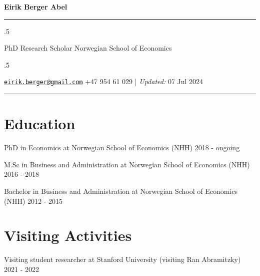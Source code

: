 \documentclass[11pt,]{article}
\begin{document}
\centerline{\huge \bf Eirik Berger Abel}

\vspace{2 mm}

\hrule

\vspace{2 mm}

\moveleft.5\hoffset\centerline{PhD Research Scholar \textbar{} Norwegian
School of Economics}

\moveleft.5\hoffset\centerline{ \faEnvelopeO \hspace{1 mm} \href{mailto:}{\tt \href{mailto:eirik.berger@gmail.com}{\nolinkurl{eirik.berger@gmail.com}}} \hspace{1 mm}  \faPhone \hspace{1 mm}  +47
954 61 029  \hspace{1 mm}         | \emph{Updated:} 07 Jul 2024}



\vspace{2 mm}

\hrule



\hypertarget{education}{%
\section{Education}\label{education}}

PhD in Economics at Norwegian School of Economics (NHH) \hfill 2018 -
ongoing\vspace{-0.2cm}

M.Sc in Business and Administration at Norwegian School of Economics
(NHH) \hfill 2016 - 2018\vspace{-0.2cm}

Bachelor in Business and Administration at Norwegian School of Economics
(NHH) \hfill 2012 - 2015\vspace{-0.2cm}

\vspace{0.5cm}

\hypertarget{visiting-activities}{%
\section{Visiting Activities}\label{visiting-activities}}

Visiting student researcher at Stanford University (visiting Ran
Abramitzky) \hfill 2021 - 2022\vspace{-0.2cm}

\vspace{0.5cm}
\end{document}

